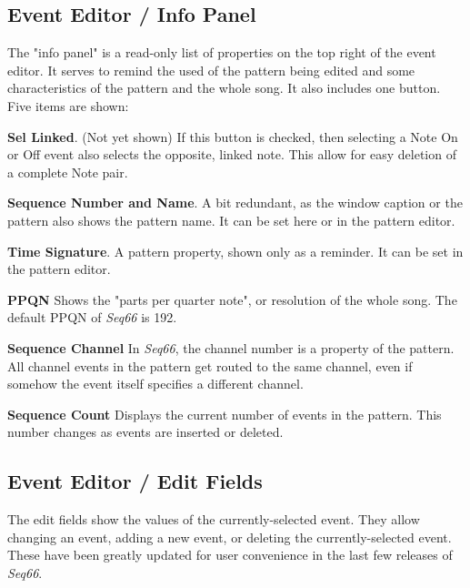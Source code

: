 \subsection{Event Editor / Info Panel}
\label{subsec:event_editor_info}

   The "info panel" is a read-only list of properties on the top right
   of the event editor.  It serves to remind the used of the pattern being
   edited and some characteristics of the pattern and the whole song.
   It also includes one button.
   Five items are shown:

   \begin{enumber}
      \item \textbf{Sel Linked}. (Not yet shown)
         If this button is checked, then selecting a Note On or Off event
         also selects the opposite, linked note.
         This allow for easy deletion of a complete Note pair.
      \item \textbf{Sequence Number and Name}.
         A bit redundant, as the window caption or the pattern
         also shows the pattern name.
         It can be set here or in the pattern editor.
      \item \textbf{Time Signature}.
         A pattern property, shown only as a reminder.
         It can be set in the pattern editor.
      \item \textbf{PPQN}
         Shows the "parts per quarter note", or resolution of the
         whole song.  The default PPQN of \textsl{Seq66} is 192.
      \item \textbf{Sequence Channel}
         In \textsl{Seq66}, the channel number is a property of the
         pattern.  All channel events in the pattern get routed to the same
         channel, even if somehow the event itself specifies a different
         channel.
      \item \textbf{Sequence Count}
         Displays the current number of events in the pattern.
         This number changes as events are inserted or deleted.
   \end{enumber}

\subsection{Event Editor / Edit Fields}
\label{subsec:event_editor_fields}

   The edit fields show the values of the currently-selected event.  They allow
   changing an event, adding a new event, or deleting the currently-selected
   event. These have been greatly updated for user convenience in the last
   few releases of \textsl{Seq66}.

